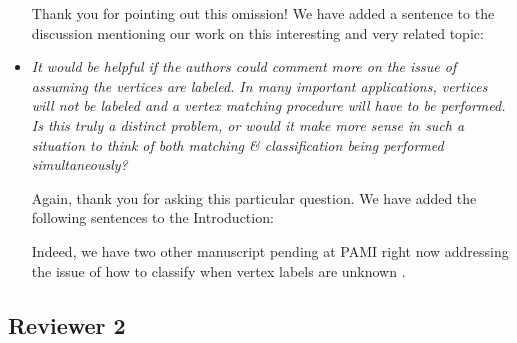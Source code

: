 \begin{itemize}
	Thank you for pointing out this omission!  We have added a sentence to the discussion mentioning our work on this interesting and very related topic:
	

	
	\item \emph{It would be helpful if the authors could comment more on the issue of assuming the vertices are labeled. In many important applications, vertices will not be labeled and a vertex matching procedure will have to be performed. Is this truly a distinct problem, or would it make more sense in such a situation to think of both matching \& classification being performed simultaneously?}
	
	Again, thank you for asking this particular question.  We have added the following sentences to the Introduction:
	
	
	Indeed, we have two other manuscript pending at PAMI right now addressing the issue of how to classify when vertex labels are unknown \cite{VP11_QAP, VP11_unlabeled}.  
	
	
\end{itemize}


\subsection*{Reviewer 2}


